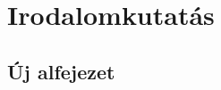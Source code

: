 \chapter{Irodalomkutatás}

\thispagestyle{fancy}
\pagestyle{fancy}

\vspace{8pt}
\section{Új alfejezet}
\cite{tensor}